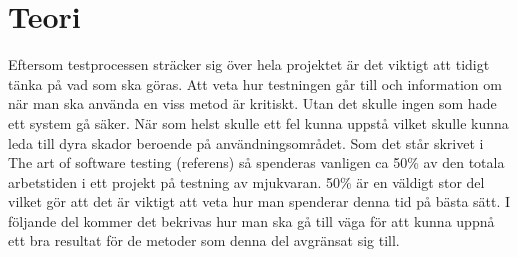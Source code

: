 \section{Teori}
	Eftersom testprocessen sträcker sig över hela projektet är det viktigt att tidigt tänka på vad som ska göras. Att veta hur testningen går till och information om när man ska använda en viss metod är kritiskt. Utan det skulle ingen som hade ett system gå säker. När som helst skulle ett fel kunna uppstå vilket skulle kunna leda till dyra skador beroende på användningsområdet. \newline
	Som det står skrivet i The art of software testing (referens) så spenderas vanligen ca 50\% av den totala arbetstiden i ett projekt på testning av mjukvaran. 50\% är en väldigt stor del vilket gör att det är viktigt att veta hur man spenderar denna tid på bästa sätt. I följande del kommer det bekrivas hur man ska gå till väga för att kunna uppnå ett bra resultat för de metoder som denna del avgränsat sig till.